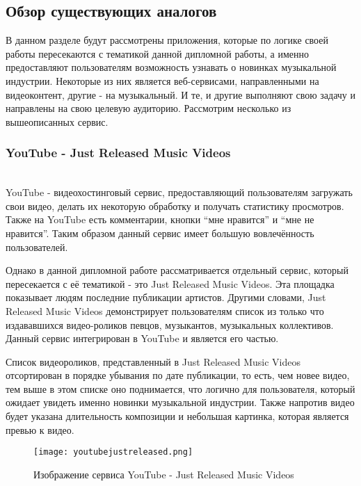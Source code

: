 \subsection{Обзор существующих аналогов}
\label{sub:domain:analogues_review}
В данном разделе будут рассмотрены приложения, которые по логике своей работы пересекаются с тематикой данной дипломной работы, а именно предоставляют пользователям возможность узнавать о новинках музыкальной индустрии. Некоторые из них является веб-сервисами, направленными на видеоконтент, другие - на музыкальный. И те, и другие выполняют свою задачу и направлены на свою целевую аудиторию. Рассмотрим несколько из вышеописанных сервис.

\subsubsection{YouTube - Just Released Music Videos}
\label{sub:domain:analogues_review:youtube}
~\\

\indent YouTube - видеохостинговый сервис, предоставляющий пользователям загружать свои видео, делать их некоторую обработку и получать статистику просмотров. Также на YouTube есть комментарии, кнопки “мне нравится” и “мне не нравится”. Таким образом данный сервис имеет большую вовлечённость пользователей.

Однако в данной дипломной работе рассматривается отдельный сервис, который пересекается с её тематикой - это Just Released Music Videos. Эта площадка показывает людям последние публикации артистов. Другими словами, Just Released Music Videos демонстрирует пользователям список из только что издававшихся видео-роликов певцов, музыкантов, музыкальных коллективов. Данный сервис интегрирован в YouTube и является его частью.

Список видеороликов, представленный в Just Released Music Videos отсортирован в порядке убывания по дате публикации, то есть, чем новее видео, тем выше в этом списке оно поднимается, что логично для пользователя, который ожидает увидеть именно новинки музыкальной индустрии. Также напротив видео будет указана длительность композиции и небольшая картинка, которая является превью к видео.

\begin{figure}[ht]
\centering
  \texttt{[image: youtubejustreleased.png]}
  \caption{ Изображение сервиса YouTube - Just Released Music Videos }
  \label{fig:domain:youtube_just_released_music_videos:picture}
\end{figure}

